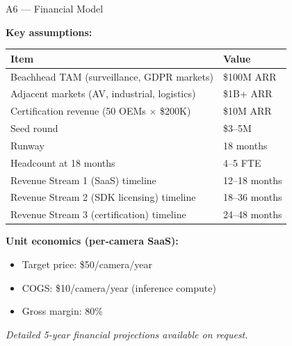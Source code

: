 \documentclass[aspectratio=169, professionalfonts, 10pt]{beamer}
\begin{document}
\begin{frame}{A6 --- Financial Model}

  \textbf{Key assumptions:}

  \medskip
  \begin{tabular}{@{}ll@{}}
    \toprule
    Item & Value \\
    \midrule
    Beachhead TAM (surveillance, GDPR markets) & \$100M ARR \\
    Adjacent markets (AV, industrial, logistics) & \$1B+ ARR \\
    Certification revenue (50 OEMs $\times$ \$200K) & \$10M ARR \\
    \midrule
    Seed round & \$3--5M \\
    Runway & 18 months \\
    Headcount at 18 months & 4--5 FTE \\
    \midrule
    Revenue Stream 1 (SaaS) timeline & 12--18 months \\
    Revenue Stream 2 (SDK licensing) timeline & 18--36 months \\
    Revenue Stream 3 (certification) timeline & 24--48 months \\
    \bottomrule
  \end{tabular}

  \bigskip
  \textbf{Unit economics (per-camera SaaS):} \\
  \begin{itemize}
    \item Target price: \$50/camera/year \\
    \item COGS: \$10/camera/year (inference compute) \\
    \item Gross margin: 80\% \\
  \end{itemize}

  \vspace{0.3em}
  \textit{Detailed 5-year financial projections available on request.}
\end{frame}
\end{document}
